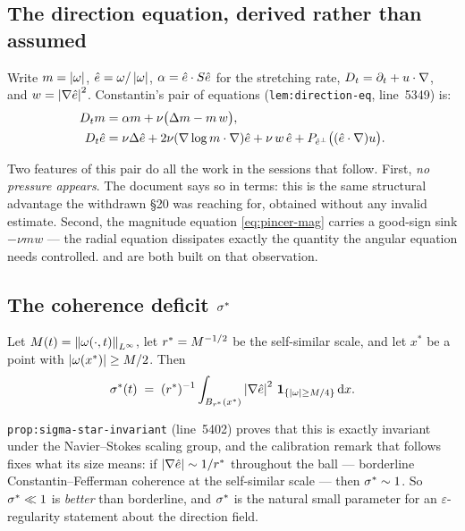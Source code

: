 \subsection{The direction equation, derived rather than assumed}

Write \(m=\left|\omega\right|\), \(\hat{e}=\omega/\left|\omega\right|\),
\(\alpha=\hat{e}\cdot S\hat{e}\) for the stretching rate, \(D_t=\partial_t+u\cdot\nabla\),
and \(w=\left|\nabla\hat{e}\right|^2\). Constantin's pair of equations
(\texttt{lem:direction-eq}, line~5349) is:
\begin{align}
  D_t m &= \alpha m + \nu\bigl(\Delta m - m\,w\bigr),
    \label{eq:pincer-mag}\\
  D_t\hat{e} &= \nu\Delta\hat{e} + 2\nu(\nabla\log m\cdot\nabla)\hat{e}
    + \nu\,w\,\hat{e} + P_{\hat{e}^{\perp}}\bigl((\hat{e}\cdot\nabla)u\bigr).
    \label{eq:pincer-dir}
\end{align}

Two features of this pair do all the work in the sessions that follow. First,
\emph{no pressure appears}. The document says so in terms: this is the same
structural advantage the withdrawn \S20 was reaching for, obtained without any
invalid estimate. Second, the magnitude equation \eqref{eq:pincer-mag} carries
a good-sign sink \(-\nu m w\) --- the radial equation dissipates exactly the
quantity the angular equation needs controlled.  and  are both
built on that observation.

\subsection{\texorpdfstring{The coherence deficit \(\sigma^{*}\)}{The coherence deficit sigma-star}}

\begin{defn}
\label{def:sstar}
Let \(M(t)=\left\|\omega(\cdot,t)\right\|_{L^\infty}\), let \(r^{*}=M^{-1/2}\) be the
self-similar scale, and let \(x^*\) be a point with \(\left|\omega(x^*)\right|\ge
M/2\). Then
\[
  \sigma^{*}(t) \;=\; (r^{*})^{-1}\int_{B_{r^{*}}(x^*)}
    \left|\nabla\hat{e}\right|^2\,\mathbf 1_{\{\left|\omega\right|\ge M/4\}}\,\mathrm{d} x .
\]
\end{defn}

\texttt{prop:sigma-star-invariant} (line~5402) proves that this is exactly
invariant under the Navier--Stokes scaling group, and the calibration remark
that follows fixes what its size means: if \(\left|\nabla\hat{e}\right|\sim1/r^{*}\)
throughout the ball --- borderline Constantin--Fefferman coherence at the
self-similar scale --- then \(\sigma^{*}\sim1\). So \(\sigma^{*}\ll1\) is
\emph{better} than borderline, and \(\sigma^{*}\) is the natural small parameter
for an \(\varepsilon\)-regularity statement about the direction field.

